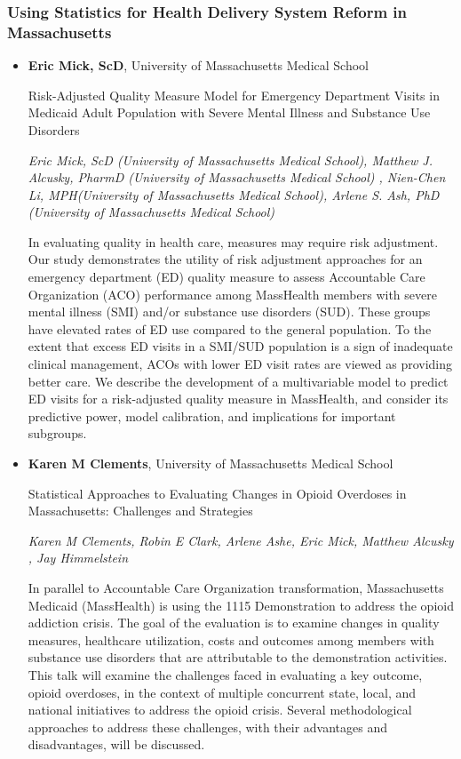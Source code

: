 \subsubsection*{Using Statistics for Health Delivery System Reform in Massachusetts}

\begin{itemize}
\item \textbf{Eric Mick, ScD}, University of Massachusetts Medical School

Risk-Adjusted Quality Measure Model for Emergency Department Visits in Medicaid Adult Population with Severe Mental Illness and Substance Use Disorders

\emph{\footnotesize Eric Mick, ScD (University of Massachusetts Medical School), Matthew J. Alcusky, PharmD (University of Massachusetts Medical School) , Nien-Chen Li, MPH(University of Massachusetts Medical School), Arlene S. Ash, PhD (University of Massachusetts Medical School)}

In evaluating quality in health care, measures may require risk adjustment. Our study demonstrates the utility of risk adjustment approaches for an emergency department (ED) quality measure to assess Accountable Care Organization (ACO) performance among MassHealth members with severe mental illness (SMI) and/or substance use disorders (SUD). These groups have elevated rates of ED use compared to the general population. To the extent that excess ED visits in a SMI/SUD population is a sign of inadequate clinical management, ACOs with lower ED visit rates are viewed as providing better care. We describe the development of a multivariable model to predict ED visits for a risk-adjusted quality measure in MassHealth, and consider its predictive power, model calibration, and implications for important subgroups.

\item \textbf{Karen M Clements}, University of Massachusetts Medical School

Statistical Approaches to Evaluating Changes in Opioid Overdoses in Massachusetts: Challenges and Strategies

\emph{\footnotesize Karen M Clements, Robin E Clark, Arlene Ashe, Eric Mick, Matthew Alcusky , Jay Himmelstein}

In parallel to Accountable Care Organization transformation, Massachusetts Medicaid (MassHealth)  is using the 1115 Demonstration to address the opioid addiction crisis.  The goal of the evaluation is to examine changes in quality measures, healthcare utilization, costs and outcomes among members with substance use disorders that are attributable to the demonstration activities.  This talk will  examine the challenges faced in  evaluating a  key outcome, opioid overdoses, in the context of multiple concurrent state, local, and national initiatives to address the opioid crisis.   Several  methodological approaches to  address these challenges, with their advantages and disadvantages, will be discussed.


\end{itemize}
